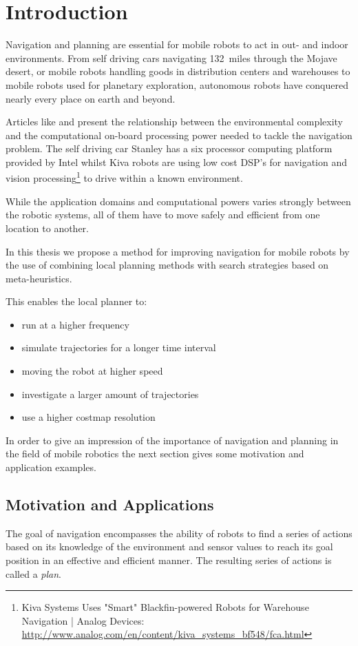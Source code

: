 \chapter{Introduction}\label{ch:introduction}
Navigation and planning are essential for mobile robots to act in out- and indoor environments. 
From self driving cars navigating 132~miles through the Mojave desert, or mobile robots handling goods in distribution centers and warehouses to mobile robots used for planetary exploration, autonomous robots have conquered nearly every place on earth and beyond.
 
Articles like \cite{stanley} and \cite{kiva} present the relationship between the environmental complexity and the computational on-board processing power needed to tackle the navigation problem.
The self driving car Stanley has a six processor computing platform provided by Intel whilst Kiva robots are using low cost DSP's for navigation and vision processing\footnote{Kiva Systems Uses "Smart" Blackfin-powered Robots for Warehouse Navigation | Analog Devices: \url{http://www.analog.com/en/content/kiva_systems_bf548/fca.html}} to drive within a known environment.  

While the application domains and computational powers varies strongly between the robotic systems, all of them have to move safely and efficient from one location to another.   

In this thesis we propose a method for improving navigation for mobile robots by the use of combining local planning methods with search strategies based on meta-heuristics.

This enables the local planner to:
\begin{itemize}
\item run at a higher frequency
\item simulate trajectories for a longer time interval
\item moving the robot at higher speed
\item investigate a larger amount of trajectories
\item use a higher costmap resolution
\end{itemize}

In order to give an impression of the importance of navigation and planning in the field of mobile robotics the next section gives some motivation and application examples.

\section{Motivation and Applications}\label{sec:motivation} 
The goal of navigation encompasses the ability of robots to find a series of actions based on its knowledge of the environment and sensor values to reach its goal position in an effective and efficient manner.
The resulting series of actions is called a \emph{plan}. 

